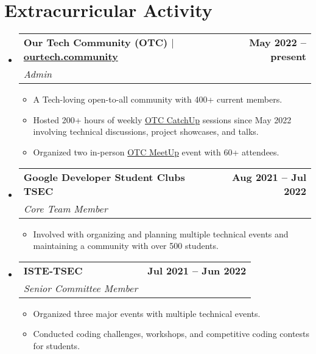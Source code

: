 \documentclass[letterpaper,11pt]{article}
\makeatletter
\newcommand{\resumeItem}[1]{
  \item\small{
    {#1 \vspace{-2pt}}
  }
}
\newcommand{\resumeSubheading}[4]{
  \vspace{-2pt}\item
    \begin{tabular*}{1.0\textwidth}[t]{l@{\extracolsep{\fill}}r}
      \vspace{-2pt}\textbf{#1} & \textbf{\small #2} \\
      \textit{\small#3} & \textit{\small #4} \\
    \end{tabular*}\vspace{-7pt}
}
\newcommand{\resumeSubHeadingListStart}{\begin{itemize}[leftmargin=0.0in, label={}]}
\newcommand{\resumeSubHeadingListEnd}{\end{itemize}}
\newcommand{\resumeItemListStart}{\begin{itemize}}
\newcommand{\resumeItemListEnd}{\end{itemize}\vspace{-5pt}}
\makeatother
\begin{document}
\section{Extracurricular Activity}
    \vspace{-2pt}
    \resumeSubHeadingListStart
        \resumeSubheading
            {Our Tech Community (OTC) $|$ \normalfont\href{https://ourtech.community}{ourtech.community}}{May 2022 -- present}
            {Admin}{}
            \vspace{-7pt}
            \resumeItemListStart
                \resumeItem{A Tech-loving open-to-all community with 400+ current members.}
                \resumeItem{Hosted 200+ hours of weekly \href{https://catchup.ourtech.community}{OTC CatchUp} sessions since May 2022 involving technical discussions, project showcases, and talks.}
                \resumeItem{Organized two in-person \href{https://meetup.ourtech.community}{OTC MeetUp} event with 60+ attendees.}
            \resumeItemListEnd
        \vspace{-4pt}

        \resumeSubheading
            {Google Developer Student Clubs TSEC}{Aug 2021 -- Jul 2022}
            {Core Team Member}{}
            \vspace{-7pt}
            \resumeItemListStart
                \resumeItem{Involved with organizing and planning multiple technical events and maintaining a community with over 500 students.}
            \resumeItemListEnd
        \vspace{-4pt}
        
        \resumeSubheading
            {ISTE-TSEC}{Jul 2021 -- Jun 2022}
            {Senior Committee Member}{}
            \vspace{-7pt}
            \resumeItemListStart
                \resumeItem{Organized three major events with multiple technical events.}
                \resumeItem{Conducted coding challenges, workshops, and competitive coding contests for students.}
            \resumeItemListEnd

    \resumeSubHeadingListEnd
\vspace{-8pt}
\end{document}
